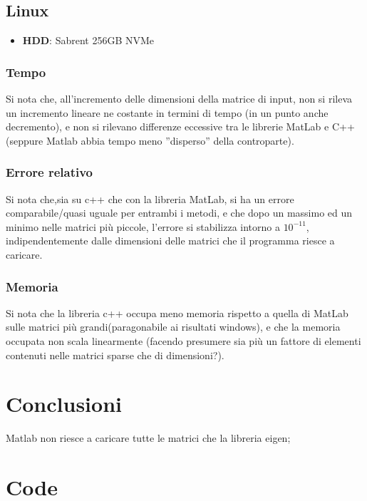 \documentclass[12pt]{article}
\begin{document}
	\subsection{Linux}
	\begin{itemize}
		\item \textbf{HDD}: Sabrent 256GB NVMe
	\end{itemize}
		\subsubsection{Tempo}
		Si nota che, all'incremento delle dimensioni della matrice di input, non si rileva un incremento lineare ne costante in termini di tempo (in un punto anche decremento), e non si rilevano differenze eccessive tra le librerie MatLab e C++ (seppure Matlab abbia tempo meno ''disperso'' della controparte).
		\begin{figure}[h!]
			 \centering
 		\end{figure}
		\subsubsection{Errore relativo}
					Si nota che,sia su c++ che con la libreria MatLab, si ha un errore comparabile/quasi uguale per entrambi i metodi, e che dopo un massimo ed un minimo nelle matrici più piccole, l'errore si stabilizza intorno a $10^{-11}$, indipendentemente dalle dimensioni delle matrici che il programma riesce a caricare.
		\begin{figure}[h!]
			 \centering
 		\end{figure}
		\subsubsection{Memoria}
						Si nota che la libreria c++ occupa meno memoria rispetto a quella di MatLab sulle matrici più grandi(paragonabile ai risultati windows), e che la memoria occupata non scala linearmente (facendo presumere sia più un fattore di elementi contenuti nelle matrici sparse che di dimensioni?).
		\begin{figure}[h!]
			 \centering
 		\end{figure}
\section{Conclusioni}
	Matlab non riesce a caricare tutte le matrici che la libreria eigen;
\section{Code}
\end{document}
